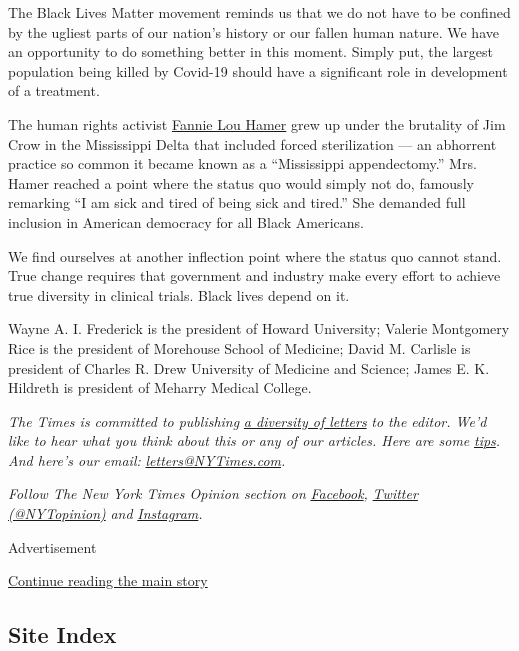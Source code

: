 The Black Lives Matter movement reminds us that we do not have to be
confined by the ugliest parts of our nation's history or our fallen
human nature. We have an opportunity to do something better in this
moment. Simply put, the largest population being killed by Covid-19
should have a significant role in development of a treatment.

The human rights activist
\href{https://blogs.cdc.gov/healthequity/2015/04/30/mhmonth/}{Fannie Lou
Hamer} grew up under the brutality of Jim Crow in the Mississippi Delta
that included forced sterilization --- an abhorrent practice so common
it became known as a ``Mississippi appendectomy.'' Mrs. Hamer reached a
point where the status quo would simply not do, famously remarking ``I
am sick and tired of being sick and tired.'' She demanded full inclusion
in American democracy for all Black Americans.

We find ourselves at another inflection point where the status quo
cannot stand. True change requires that government and industry make
every effort to achieve true diversity in clinical trials. Black lives
depend on it.

Wayne A. I. Frederick is the president of Howard University; Valerie
Montgomery Rice is the president of Morehouse School of Medicine; David
M. Carlisle is president of Charles R. Drew University of Medicine and
Science; James E. K. Hildreth is president of Meharry Medical College.

\emph{The Times is committed to publishing}
\href{https://www.nytimes3xbfgragh.onion/2019/01/31/opinion/letters/letters-to-editor-new-york-times-women.html}{\emph{a
diversity of letters}} \emph{to the editor. We'd like to hear what you
think about this or any of our articles. Here are some}
\href{https://help.nytimes3xbfgragh.onion/hc/en-us/articles/115014925288-How-to-submit-a-letter-to-the-editor}{\emph{tips}}\emph{.
And here's our email:}
\href{mailto:letters@NYTimes.com}{\emph{letters@NYTimes.com}}\emph{.}

\emph{Follow The New York Times Opinion section on}
\href{https://www.facebookcorewwwi.onion/nytopinion}{\emph{Facebook}}\emph{,}
\href{http://twitter.com/NYTOpinion}{\emph{Twitter (@NYTopinion)}}
\emph{and}
\href{https://www.instagram.com/nytopinion/}{\emph{Instagram}}\emph{.}

Advertisement

\protect\hyperlink{after-bottom}{Continue reading the main story}

\hypertarget{site-index}{%
\subsection{Site Index}\label{site-index}}

